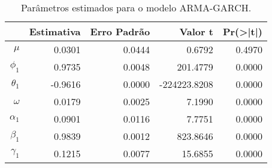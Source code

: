 \begin{table}[ht]
\centering
\begin{tabular}{rrrrr}
  \hline
 & Estimativa & Erro Padr\~ao & Valor t & Pr(>|t|) \\ 
  \hline
$\mu$ & 0.0301 & 0.0444 & 0.6792 & 0.4970 \\ 
  $\phi_1$ & 0.9735 & 0.0048 & 201.4779 & 0.0000 \\ 
  $\theta_1$ & -0.9616 & 0.0000 & -224223.8208 & 0.0000 \\ 
  $\omega$ & 0.0179 & 0.0025 & 7.1990 & 0.0000 \\ 
  $\alpha_1$ & 0.0901 & 0.0116 & 7.7751 & 0.0000 \\ 
  $\beta_1$ & 0.9839 & 0.0012 & 823.8646 & 0.0000 \\ 
  $\gamma_1$ & 0.1215 & 0.0077 & 15.6855 & 0.0000 \\ 
   \hline
\end{tabular}
\caption{Par\^ametros estimados para o modelo ARMA-GARCH.} 
\label{tab:artigoarma}
\end{table}
